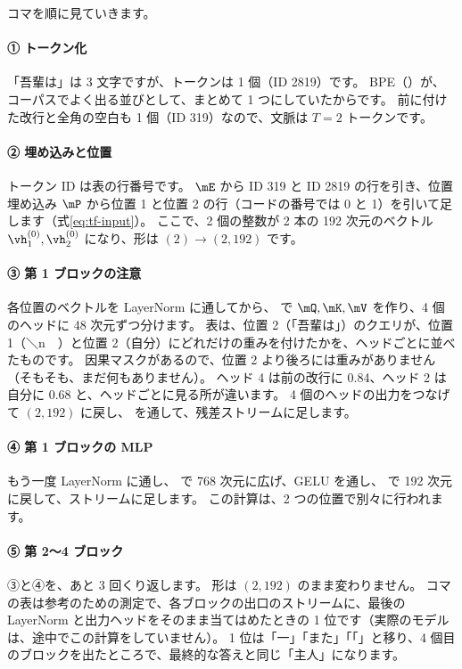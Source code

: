 コマを順に見ていきます。

\paragraph{① トークン化}
「吾輩は」は 3 文字ですが、トークンは 1 個（ID 2819）です。
BPE（）が、コーパスでよく出る並びとして、まとめて 1 つにしていたからです。
前に付けた改行と全角の空白も 1 個（ID 319）なので、文脈は $T=2$ トークンです。

\paragraph{② 埋め込みと位置}
トークン ID は表の行番号です。
$\mE$ から ID 319 と ID 2819 の行を引き、位置埋め込み $\mP$ から位置 1 と位置 2 の行（コードの番号では 0 と 1）を引いて足します（式\eqref{eq:tf-input}）。
ここで、2 個の整数が 2 本の 192 次元のベクトル $\vh^{(0)}_1,\vh^{(0)}_2$ になり、形は $(2)\to(2,192)$ です。

\paragraph{③ 第 1 ブロックの注意}
各位置のベクトルを LayerNorm に通してから、 で $\mQ,\mK,\mV$ を作り、4 個のヘッドに 48 次元ずつ分けます。
表は、位置 2（「吾輩は」）のクエリが、位置 1（＼n　）と位置 2（自分）にどれだけの重みを付けたかを、ヘッドごとに並べたものです。
因果マスクがあるので、位置 2 より後ろには重みがありません（そもそも、まだ何もありません）。
ヘッド 4 は前の改行に 0.84、ヘッド 2 は自分に 0.68 と、ヘッドごとに見る所が違います。
4 個のヘッドの出力をつなげて $(2,192)$ に戻し、 を通して、残差ストリームに足します。

\paragraph{④ 第 1 ブロックの MLP}
もう一度 LayerNorm に通し、 で 768 次元に広げ、GELU を通し、 で 192 次元に戻して、ストリームに足します。
この計算は、2 つの位置で別々に行われます。

\paragraph{⑤ 第 2〜4 ブロック}
③と④を、あと 3 回くり返します。
形は $(2,192)$ のまま変わりません。
コマの表は参考のための測定で、各ブロックの出口のストリームに、最後の LayerNorm と出力ヘッドをそのまま当てはめたときの 1 位です（実際のモデルは、途中でこの計算をしていません）。
1 位は「一」「また」「「」と移り、4 個目のブロックを出たところで、最終的な答えと同じ「主人」になります。

